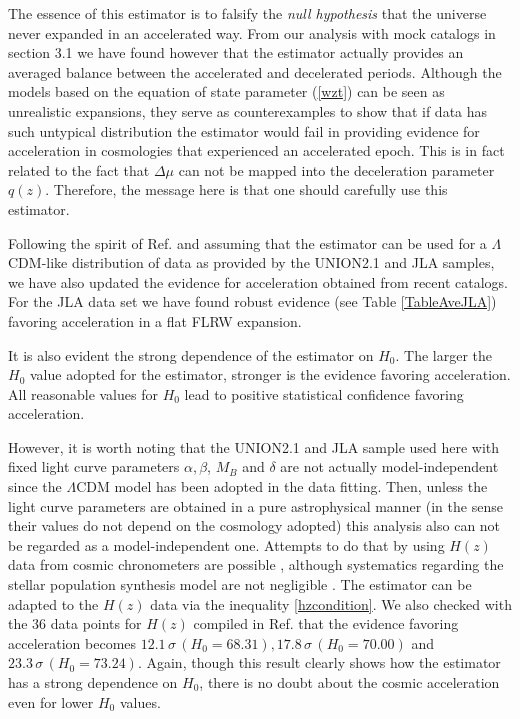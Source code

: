 \documentclass[nofootinbib,twocolumn]{revtex4}
\begin{document}
The essence of this estimator is to falsify the {\it null hypothesis} that the universe never expanded in an accelerated way. From our analysis with mock catalogs in section 3.1 we have found however that the estimator actually provides an averaged balance between the accelerated and decelerated periods. Although the models based on the equation of state parameter (\ref{wzt}) can be seen as unrealistic expansions, they serve as counterexamples to show that if data has such untypical distribution the estimator would fail in providing evidence for acceleration in cosmologies that experienced an accelerated epoch. This is in fact related to the fact that $\Delta \mu$ can not be mapped into the deceleration parameter $q(z)$. Therefore, the message here is that one should carefully use this estimator.

Following the spirit of Ref. \cite{Seikel:2007pk,Seikel:2008ms} and assuming that the estimator can be used for a $\Lambda$CDM-like distribution of data as provided by the UNION2.1 and JLA samples, we have also updated the evidence for acceleration obtained from recent catalogs. For the JLA data set we have found robust evidence (see Table \ref{TableAveJLA}) favoring acceleration in a flat FLRW expansion.


It is also evident the strong dependence of the estimator on $H_0$. The larger the $H_0$ value adopted for the estimator, stronger is the evidence favoring acceleration. All reasonable values for $H_0$ lead to positive statistical confidence favoring acceleration.

However, it is worth noting that the UNION2.1 and JLA sample used here with fixed light curve parameters $\alpha,  \beta$, $M_{B}$ and $\delta$ are not actually model-independent since the $\Lambda$CDM model has been adopted in the data fitting. Then, unless the light curve parameters are obtained in a pure astrophysical manner (in the sense their values do not depend on the cosmology adopted) this analysis also can not be regarded as a model-independent one. Attempts to do that by using $H(z)$ data from cosmic chronometers are possible \cite{javier2016}, although systematics regarding the stellar population synthesis model are not negligible \cite{busti2014}. The estimator can be adapted to the $H(z)$ data via the inequality \ref{hzcondition}. We also checked with the 36 data points for $H(z)$ compiled in Ref. \cite{Yu:2017iju} that the evidence favoring acceleration becomes $ 12.1 \, \sigma \,(H_0=68.31), 17.8 \,\sigma \,(H_0=70.00)$ and $23.3 \,\sigma \,(H_0= 73.24)$. Again, though this result clearly shows how the estimator has a strong dependence on $H_0$, there is no doubt about the cosmic acceleration even for lower $H_0$ values.
\end{document}
